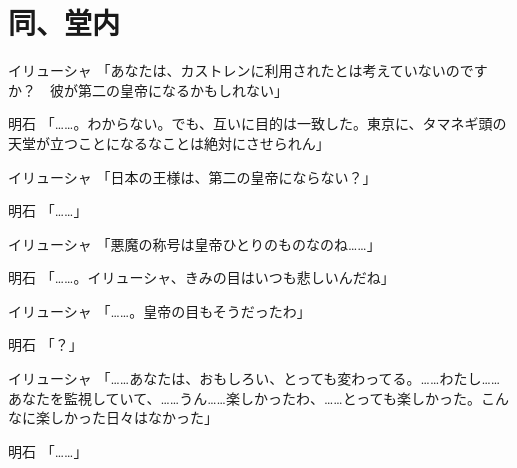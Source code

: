\section*{同、堂内}

イリューシャ	「あなたは、カストレンに利用されたとは考えていないのですか？　彼が第二の皇帝になるかもしれない」

明石	「……。わからない。でも、互いに目的は一致した。東京に、タマネギ頭の天堂が立つことになるなことは絶対にさせられん」

イリューシャ	「日本の王様は、第二の皇帝にならない？」

明石	「……」

イリューシャ	「悪魔の称号は皇帝ひとりのものなのね……」

明石	「……。イリューシャ、きみの目はいつも悲しいんだね」

イリューシャ	「……。皇帝の目もそうだったわ」

明石	「？」

イリューシャ	「……あなたは、おもしろい、とっても変わってる。……わたし……あなたを監視していて、……うん……楽しかったわ、……とっても楽しかった。こんなに楽しかった日々はなかった」

明石	「……」
